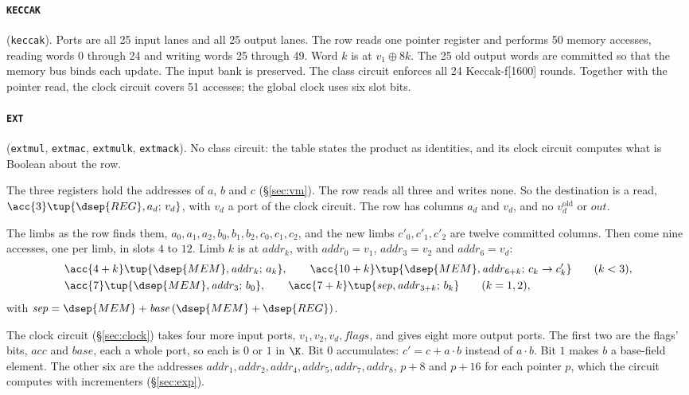 \paragraph{\texttt{KECCAK}} (\texttt{keccak}). Ports are all 25 input lanes and all 25 output lanes. The row reads one pointer register and performs 50 memory accesses, reading words 0 through 24 and writing words 25 through 49. Word $k$ is at $v_1\oplus8k$. The 25 old output words are committed so that the memory bus binds each update. The input bank is preserved. The class circuit enforces all 24 Keccak-f[1600] rounds. Together with the pointer read, the clock circuit covers 51 accesses; the global clock uses six slot bits.

\paragraph{\texttt{EXT}} (\texttt{extmul}, \texttt{extmac}, \texttt{extmulk}, \texttt{extmack}). No class circuit: the table states the product as identities, and its clock circuit computes what is Boolean about the row.

The three registers hold the addresses of $a$, $b$ and $c$ (\S\ref{sec:vm}). The row reads all three and writes none. So the destination is a read, $\acc{3}\tup{\dsep{REG},a_d;\,v_d}$, with $v_d$ a port of the clock circuit. The row has columns $a_d$ and $v_d$, and no $v_d^{\mathrm{old}}$ or $\mathit{out}$.

The limbs as the row finds them, $a_0,a_1,a_2,b_0,b_1,b_2,c_0,c_1,c_2$, and the new limbs $c'_0,c'_1,c'_2$ are twelve committed columns. Then come nine accesses, one per limb, in slots $4$ to $12$. Limb $k$ is at $\mathit{addr}_k$, with $\mathit{addr}_0=v_1$, $\mathit{addr}_3=v_2$ and $\mathit{addr}_6=v_d$:
\begin{align*}
  &\acc{4+k}\tup{\dsep{MEM},\mathit{addr}_k;\,a_k},\qquad
  \acc{10+k}\tup{\dsep{MEM},\mathit{addr}_{6+k};\,c_k\to c'_k}\qquad(k<3),\\
  &\acc{7}\tup{\dsep{MEM},\mathit{addr}_3;\,b_0},\qquad
  \acc{7+k}\tup{\mathit{sep},\mathit{addr}_{3+k};\,b_k}\qquad(k=1,2),
\end{align*}
with $\mathit{sep}=\dsep{MEM}+\mathit{base}\,(\dsep{MEM}+\dsep{REG})$.

The clock circuit (\S\ref{sec:clock}) takes four more input ports, $v_1,v_2,v_d,\mathit{flags}$, and gives eight more output ports. The first two are the flags' bits, $\mathit{acc}$ and $\mathit{base}$, each a whole port, so each is $0$ or $1$ in $\K$. Bit $0$ accumulates: $c'=c+a\cdot b$ instead of $a\cdot b$. Bit $1$ makes $b$ a base-field element. The other six are the addresses $\mathit{addr}_1,\mathit{addr}_2,\mathit{addr}_4,\mathit{addr}_5,\mathit{addr}_7,\mathit{addr}_8$, $p+8$ and $p+16$ for each pointer $p$, which the circuit computes with incrementers (\S\ref{sec:exp}).

